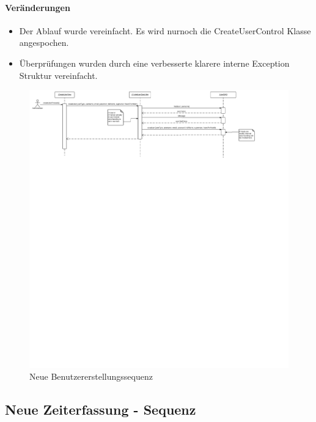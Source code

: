     \paragraph{Veränderungen}
        \begin{itemize}
            \item Der Ablauf wurde vereinfacht. Es wird nurnoch die CreateUserControl Klasse angespochen.
            \item Überprüfungen wurden durch eine verbesserte klarere interne Exception Struktur vereinfacht.
        \end{itemize}

    \begin{figure}
      \centering
        \includegraphics[width=\linewidth]{Create-user-account-new.pdf}
       \caption{Neue Benutzererstellungssequenz}
    \end{figure}

\subsection{Neue Zeiterfassung - Sequenz}

